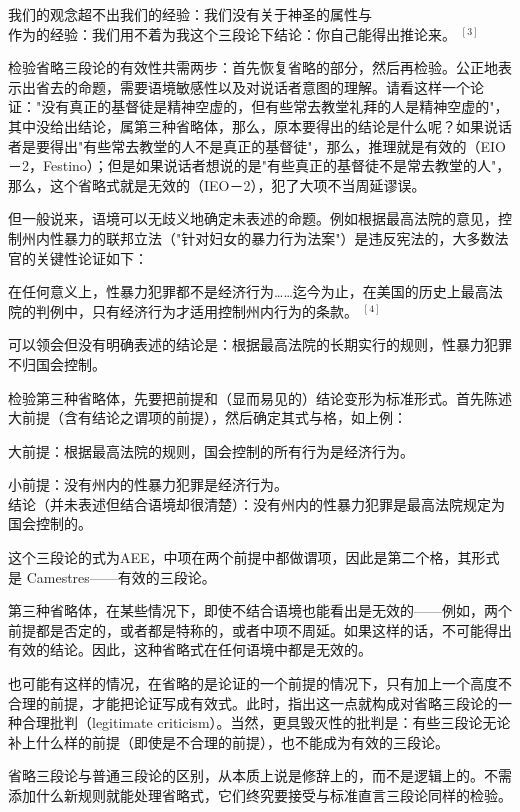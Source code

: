 我们的观念超不出我们的经验：我们没有关于神圣的属性与\\
作为的经验：我们用不着为我这个三段论下结论：你自己能得出推论来。 ${ }^{[3]}$

检验省略三段论的有效性共需两步：首先恢复省略的部分，然后再检验。公正地表示出省去的命题，需要语境敏感性以及对说话者意图的理解。请看这样一个论证："没有真正的基督徒是精神空虚的，但有些常去教堂礼拜的人是精神空虚的"，其中没给出结论，属第三种省略体，那么，原本要得出的结论是什么呢？如果说话者是要得出"有些常去教堂的人不是真正的基督徒"，那么，推理就是有效的（EIO－2，Festino）；但是如果说话者想说的是"有些真正的基督徒不是常去教堂的人"，那么，这个省略式就是无效的（IEO－2），犯了大项不当周延谬误。

但一般说来，语境可以无歧义地确定未表述的命题。例如根据最高法院的意见，控制州内性暴力的联邦立法（"针对妇女的暴力行为法案"）是违反宪法的，大多数法官的关键性论证如下：

在任何意义上，性暴力犯罪都不是经济行为……迄今为止，在美国的历史上最高法院的判例中，只有经济行为才适用控制州内行为的条款。 ${ }^{[4]}$

可以领会但没有明确表述的结论是：根据最高法院的长期实行的规则，性暴力犯罪不归国会控制。

检验第三种省略体，先要把前提和（显而易见的）结论变形为标准形式。首先陈述大前提（含有结论之谓项的前提），然后确定其式与格，如上例：

大前提：根据最高法院的规则，国会控制的所有行为是经济行为。

小前提：没有州内的性暴力犯罪是经济行为。\\
结论（并未表述但结合语境却很清楚）：没有州内的性暴力犯罪是最高法院规定为国会控制的。

这个三段论的式为AEE，中项在两个前提中都做谓项，因此是第二个格，其形式是 Camestres——有效的三段论。

第三种省略体，在某些情况下，即使不结合语境也能看出是无效的——例如，两个前提都是否定的，或者都是特称的，或者中项不周延。如果这样的话，不可能得出有效的结论。因此，这种省略式在任何语境中都是无效的。

也可能有这样的情况，在省略的是论证的一个前提的情况下，只有加上一个高度不合理的前提，才能把论证写成有效式。此时，指出这一点就构成对省略三段论的一种合理批判（legitimate criticism）。当然，更具毁灭性的批判是：有些三段论无论补上什么样的前提（即使是不合理的前提），也不能成为有效的三段论。

省略三段论与普通三段论的区别，从本质上说是修辞上的，而不是逻辑上的。不需添加什么新规则就能处理省略式，它们终究要接受与标准直言三段论同样的检验。 